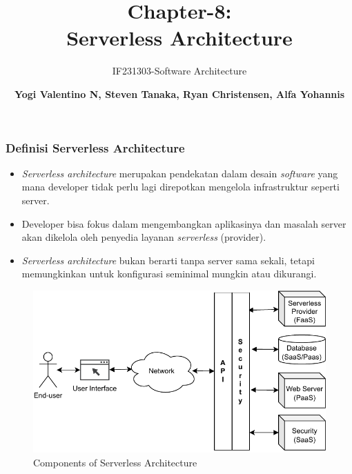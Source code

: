\documentclass[aspectratio=169, table]{beamer}
\subtitle{IF231303-Software Architecture  \vspace{10pt}}
\title{\huge Chapter-8:\\Serverless Architecture}
\author{\textbf{Yogi Valentino N, Steven Tanaka, Ryan Christensen, Alfa Yohannis}}
\begin{document}
    \begin{frame}[plain]
        \maketitle
    \end{frame}

    \begin{frame}
        \frametitle{Definisi Serverless Architecture}
        \begin{itemize}
            \item \emph{Serverless architecture} merupakan pendekatan dalam desain \emph{software} yang mana developer tidak perlu lagi direpotkan mengelola infrastruktur seperti server.
            \item Developer bisa fokus dalam mengembangkan aplikasinya dan masalah server akan dikelola oleh penyedia layanan \emph{serverless} (provider).
            \item \emph{Serverless architecture} bukan berarti tanpa server sama sekali, tetapi memungkinkan untuk konfigurasi seminimal mungkin atau dikurangi.
        \end{itemize}
    \end{frame}

    \begin{frame}
        \centering
        \begin{figure}
            \includegraphics[width=\linewidth]{serverless_architecture}
            \caption{Components of Serverless Architecture}
        \end{figure}
    \end{frame}
\end{document}
